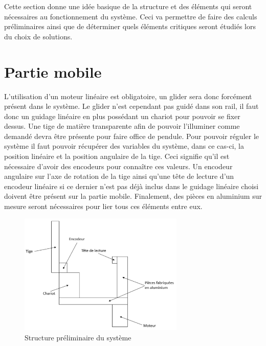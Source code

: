 Cette section donne une idée basique de la structure et des éléments qui seront nécessaires au fonctionnement du système.
Ceci va permettre de faire des calculs préliminaires ainsi que de déterminer quels éléments critiques seront étudiés lors du choix
de solutions.

\section{Partie mobile}\label{sec:PartMob}
L'utilisation d'un moteur linéaire est obligatoire, un \gls{glider} sera donc forcément présent dans le système. Le \gls{glider} n'est cependant
pas guidé dans son rail, il faut donc un guidage linéaire en plus possédant un chariot pour pouvoir se fixer dessus. Une tige de matière
transparente afin de pouvoir l'illuminer comme demandé devra être présente pour faire office de pendule. Pour pouvoir réguler le système il faut pouvoir récupérer des variables
du système, dans ce cas-ci, la position linéaire et la position angulaire de la tige. Ceci signifie qu'il est nécessaire d'avoir des encodeurs
pour connaître ces valeurs. Un encodeur angulaire sur l'axe de rotation de la tige ainsi qu'une tête de lecture d'un encodeur linéaire si ce
dernier n'est pas déjà inclus dans le guidage linéaire choisi doivent être présent sur la partie mobile. Finalement, des pièces en aluminium sur
mesure seront nécessaires pour lier tous ces éléments entre eux.

\begin{figure}[H]
    \centering
    \includegraphics[width = 0.7\textwidth]{assets/figures/StructPrelim.svg}
    \caption{Structure préliminaire du système}
    \label{fig:StructPrelim}
\end{figure}